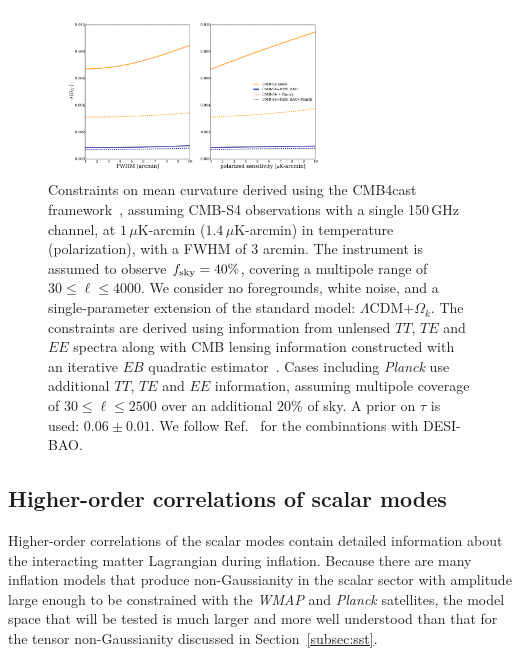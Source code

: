 \begin{figure}[h!]
\centering \includegraphics[width=0.70\textwidth]{Inflation/OmK_vs_FWHM_or_uK_arcmin.pdf}
\caption{Constraints on mean curvature derived using the CMB4cast framework~\cite{Errard:2015cxa}, assuming CMB-S4 observations with a single 150\,GHz channel, at $1\,\mu$K-arcmin ($1.4\,\mu$K-arcmin) in temperature (polarization), with a FWHM of 3 arcmin. The instrument is assumed to observe $f_{\rm sky} = 40\%$, covering a multipole range of $30\leq\ell\leq 4000$.
We consider no foregrounds, white noise, and a single-parameter extension of the standard model: $\Lambda$CDM+$\Omega_k$. 
The constraints are derived using information from unlensed $TT$, $TE$ and $EE$ spectra along with CMB lensing information constructed with an iterative $EB$ quadratic estimator~\cite{Hirata:2002jy,Smith:2010gu}. Cases including {\it Planck\/} use additional $TT$, $TE$ and $EE$ information, assuming multipole coverage of $30\leq\ell\leq 2500$ over an additional $20\%$ of sky. A prior on $\tau$ is used: $0.06\pm0.01$. We follow Ref.~\cite{Wu:2014hta} for the combinations with DESI-BAO.}
\label{fig:OmK_vs_FWHM_or_uK_arcmin}
\end{figure}


\subsection{Higher-order correlations of scalar modes}
\label{subsec:scalarNG}
Higher-order correlations of the scalar modes contain detailed information about the interacting matter Lagrangian during inflation. Because there are many inflation models that produce non-Gaussianity in the scalar sector with amplitude large enough to be constrained with the {\it WMAP\/} and {\it Planck\/} satellites, the model space that will be tested is much larger and  more well understood than that for the tensor non-Gaussianity discussed in Section~\ref{subsec:sst}.

